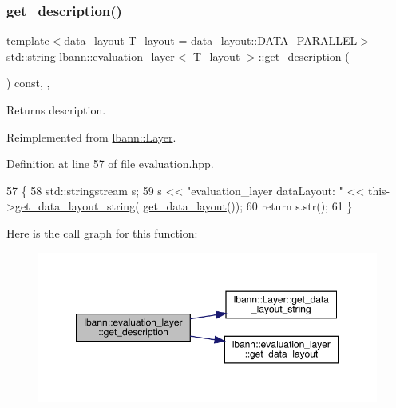 \subsubsection{\texorpdfstring{get\+\_\+description()}{get\_description()}}
{\footnotesize\ttfamily template$<$data\+\_\+layout T\+\_\+layout = data\+\_\+layout\+::\+D\+A\+T\+A\+\_\+\+P\+A\+R\+A\+L\+L\+EL$>$ \\
std\+::string \hyperlink{classlbann_1_1evaluation__layer}{lbann\+::evaluation\+\_\+layer}$<$ T\+\_\+layout $>$\+::get\+\_\+description (\begin{DoxyParamCaption}{ }\end{DoxyParamCaption}) const\hspace{0.3cm}{\ttfamily [inline]}, {\ttfamily [override]}, {\ttfamily [virtual]}}

Returns description. 

Reimplemented from \hyperlink{classlbann_1_1Layer_acc0803d3428914ca1eb5988c4309174a}{lbann\+::\+Layer}.



Definition at line 57 of file evaluation.\+hpp.


\begin{DoxyCode}
57                                              \{
58     std::stringstream s;
59      s << \textcolor{stringliteral}{"evaluation\_layer  dataLayout: "} << this->\hyperlink{classlbann_1_1Layer_ae3f4a5602df821f4221614b1e3782dc1}{get\_data\_layout\_string}(
      \hyperlink{classlbann_1_1evaluation__layer_af8a630d75b1aacc1ffc446d1c141d807}{get\_data\_layout}());
60      \textcolor{keywordflow}{return} s.str();
61   \}
\end{DoxyCode}
Here is the call graph for this function\+:\nopagebreak
\begin{figure}[H]
\begin{center}
\leavevmode
\includegraphics[width=350pt]{classlbann_1_1evaluation__layer_ac98eda59f9c45455f0f35f85cbd08a9b_cgraph}
\end{center}
\end{figure}
\mbox{\label{classlbann_1_1evaluation__layer_af4551d08c374c1f2c2d99eb543b6379d}} 

